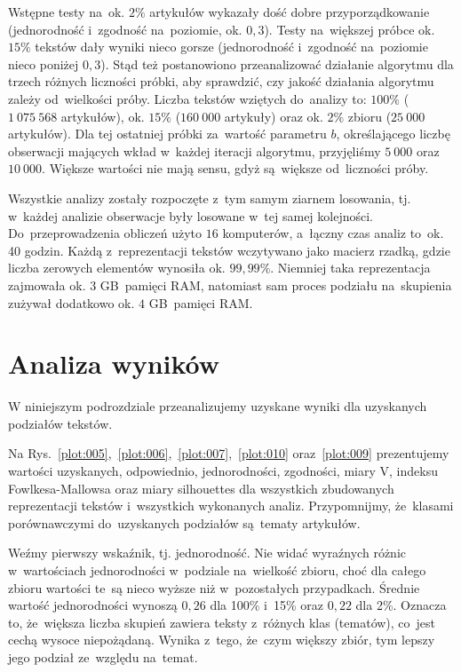 \documentclass{praca1}
\begin{document}
Wstępne testy na~ok. $2\%$ artykułów wykazały dość dobre przyporządkowanie (jednorodność i~zgodność na~poziomie,  ok. $0,3$). Testy na~większej próbce ok. $15\%$ tekstów dały wyniki nieco gorsze (jednorodność i~zgodność na~poziomie nieco poniżej $0,3$). Stąd też postanowiono przeanalizować działanie algorytmu dla trzech różnych liczności próbki, aby sprawdzić, czy jakość działania algorytmu zależy od~wielkości próby. Liczba tekstów wziętych do~analizy to: $100\%$ ($1\ 075\ 568$ artykułów), ok. $15\%$ ($160\ 000$ artykuły) oraz ok. $2\%$ zbioru ($25\ 000$ artykułów). Dla tej ostatniej próbki za~wartość parametru $b$, określającego liczbę obserwacji mających wkład w~każdej iteracji algorytmu, przyjęliśmy $5\ 000$ oraz $10\ 000$. Większe wartości nie mają sensu, gdyż są~większe od~liczności próby.

Wszystkie analizy zostały rozpoczęte z~tym samym ziarnem losowania, tj. w~każdej analizie obserwacje były losowane w~tej samej kolejności. Do~przeprowadzenia obliczeń użyto $16$ komputerów, a~łączny czas analiz to~ok. 40 godzin. Każdą z~reprezentacji tekstów wczytywano jako macierz rzadką, gdzie liczba zerowych elementów wynosiła ok. $99,99\%$. Niemniej taka reprezentacja zajmowała ok. $3$ GB~pamięci RAM, natomiast sam proces podziału na~skupienia zużywał dodatkowo ok. $4$ GB~pamięci RAM.

\section{Analiza wyników}


W niniejszym podrozdziale przeanalizujemy uzyskane wyniki dla uzyskanych podziałów tekstów.

Na Rys.~\ref{plot:005},~\ref{plot:006},~\ref{plot:007},~\ref{plot:010} oraz~\ref{plot:009} prezentujemy wartości uzyskanych, odpowiednio, jednorodności, zgodności, miary V, indeksu Fowlkesa-Mallowsa oraz miary silhouettes dla wszystkich zbudowanych reprezentacji tekstów i~wszystkich wykonanych analiz. Przypomnijmy, że~klasami porównawczymi do~uzyskanych podziałów są~tematy artykułów.

Weźmy pierwszy wskaźnik, tj. jednorodność. Nie widać wyraźnych różnic w~wartościach jednorodności w~podziale na~wielkość zbioru, choć dla całego zbioru wartości te~są nieco wyższe niż w~pozostałych przypadkach. Średnie wartość jednorodności wynoszą $0,26$ dla 100\% i~15\% oraz $0,22$ dla 2\%. Oznacza to, że~większa liczba skupień zawiera teksty z~różnych klas (tematów), co~jest cechą wysoce niepożądaną. Wynika z~tego, że~czym większy zbiór, tym lepszy jego podział ze~względu na~temat.
\end{document}
